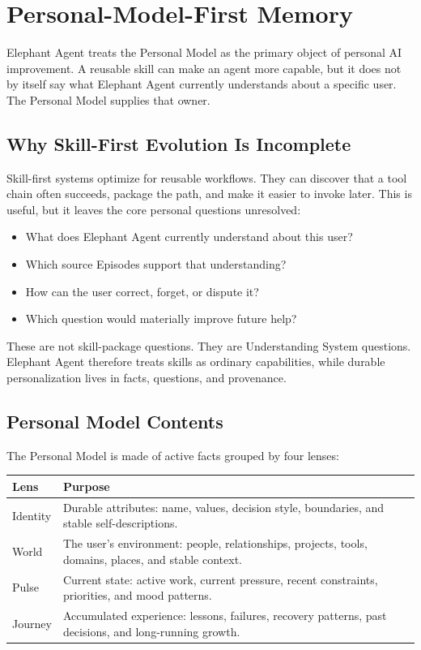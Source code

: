\section{Personal-Model-First Memory}
\label{sec:abstraction}

Elephant Agent treats the Personal Model as the primary object of personal AI
improvement. A reusable skill can make an agent more capable, but it does not
by itself say what Elephant Agent currently understands about a specific user. The
Personal Model supplies that owner.

\subsection{Why Skill-First Evolution Is Incomplete}

Skill-first systems optimize for reusable workflows. They can discover that a
tool chain often succeeds, package the path, and make it easier to invoke
later. This is useful, but it leaves the core personal questions unresolved:

\begin{itemize}[leftmargin=*]
  \item What does Elephant Agent currently understand about this user?
  \item Which source Episodes support that understanding?
  \item How can the user correct, forget, or dispute it?
  \item Which question would materially improve future help?
\end{itemize}

These are not skill-package questions. They are Understanding System questions.
Elephant Agent therefore treats skills as ordinary capabilities, while durable
personalization lives in facts, questions, and provenance.

\subsection{Personal Model Contents}

The Personal Model is made of active facts grouped by four lenses:

\begin{center}
\begin{tabularx}{0.98\linewidth}{@{}lX@{}}
\toprule
\textbf{Lens} & \textbf{Purpose} \\
\midrule
Identity & Durable attributes: name, values, decision style, boundaries, and stable self-descriptions. \\
World & The user's environment: people, relationships, projects, tools, domains, places, and stable context. \\
Pulse & Current state: active work, current pressure, recent constraints, priorities, and mood patterns. \\
Journey & Accumulated experience: lessons, failures, recovery patterns, past decisions, and long-running growth. \\
\bottomrule
\end{tabularx}
\end{center}

